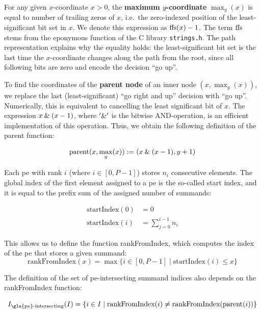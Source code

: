 For any given $x$-coordinate $x > 0$, the \textbf{maximum $y$-coordinate} $\max_y(x)$ is equal to number of trailing zeros of $x$, i.e.\ the zero-indexed position of the least-significant bit set in $x$.
We denote this expression as $\textrm{ffs} (x) - 1$.
The term $\textrm{ffs}$ stems from the eponymous function of the C library \texttt{strings.h}.
The path representation explains why the equality holds: the least-significant bit set is the last time the $x$-coordinate changes along the path from the root, since all following bits are zero and encode the decision \enquote{go up}.

To find the coordinates of the \textbf{parent node} of an inner node $(x, \max_y(x))$, we replace the last (least-significant) \enquote{go right and up} decision with \enquote{go up}. 
Numerically, this is equivalent to cancelling the least significant bit of $x$.
The expression $x \mathbin{\&} (x - 1)$, where $'\mathbin{\&}'$ is the bitwise AND-operation, is an efficient implementation of this operation.
Thus, we obtain the following definition of the parent function:

\begin{equation}
\label{eq:parent}
\textrm{parent} (x, \max_y (x) ) := (x \mathbin{\&} (x - 1), y + 1)
\end{equation}

Each \gls{pe} with rank $i$ (where $i \in [0, P - 1]$) stores $n_i$ consecutive elements.
The global index of the first element assigned to a \gls{pe} is the so-called start index, and it is equal to the prefix sum of the assigned number of summands:

\begin{align}
\textrm{startIndex} (0) &= 0 \\
\textrm{startIndex} (i) &= \sum_{j = 0}^{i - 1} n_i
\label{eq:startIndex}
\end{align}

This allows us to define the function rankFromIndex, which computes the index of the \gls{pe} that stores a given summand:
\begin{equation}
\textrm{rankFromIndex} (x) = \max \{i \in [0, P - 1] \;|\; \textrm{startIndex} (i) \leq x \}
\end{equation}

The definition of the set of \gls{pe}-intersecting summand indices also depends on the rankFromIndex function:

\newcommand{\rankIntersectingIndices}{I_{\textrm{\gls{pe}-intersecting}}}
\begin{equation}
\rankIntersectingIndices (I) = \{i \in I \;|\; \textrm{rankFromIndex} (i) \neq \textrm{rankFromIndex} (\textrm{parent} (i)) \}
\end{equation}


